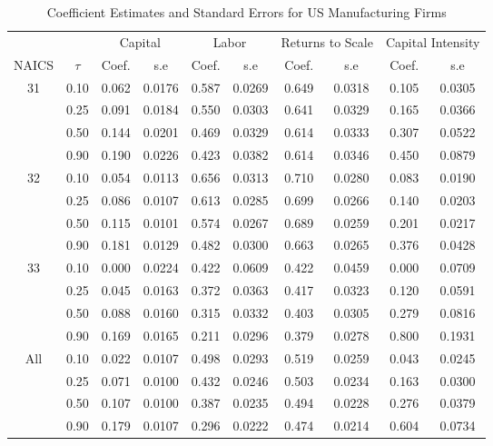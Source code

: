 \documentclass[11pt]{article}
\begin{document}
\begin{table}[H]
\centering
\caption{Coefficient Estimates and Standard Errors for US Manufacturing Firms}
\begin{tabular}{cccccccccc}
  \hline\hline & & \multicolumn{2}{c}{Capital}  & \multicolumn{2}{c}{Labor} & \multicolumn{2}{c}{Returns to Scale} & \multicolumn{2}{c}{Capital Intensity}\\ \cmidrule(lr){3-4} \cmidrule(lr){5-6} \cmidrule(lr){7-8} \cmidrule(lr){9-10}NAICS & $\tau$ & Coef. & s.e & Coef. & s.e & Coef. & s.e & Coef. & s.e \\ 
  \hline
31 & 0.10 & 0.062 & 0.0176 & 0.587 & 0.0269 & 0.649 & 0.0318 & 0.105 & 0.0305 \\ 
   & 0.25 & 0.091 & 0.0184 & 0.550 & 0.0303 & 0.641 & 0.0329 & 0.165 & 0.0366 \\ 
   & 0.50 & 0.144 & 0.0201 & 0.469 & 0.0329 & 0.614 & 0.0333 & 0.307 & 0.0522 \\ 
   & 0.90 & 0.190 & 0.0226 & 0.423 & 0.0382 & 0.614 & 0.0346 & 0.450 & 0.0879 \\ 
  32 & 0.10 & 0.054 & 0.0113 & 0.656 & 0.0313 & 0.710 & 0.0280 & 0.083 & 0.0190 \\ 
   & 0.25 & 0.086 & 0.0107 & 0.613 & 0.0285 & 0.699 & 0.0266 & 0.140 & 0.0203 \\ 
   & 0.50 & 0.115 & 0.0101 & 0.574 & 0.0267 & 0.689 & 0.0259 & 0.201 & 0.0217 \\ 
   & 0.90 & 0.181 & 0.0129 & 0.482 & 0.0300 & 0.663 & 0.0265 & 0.376 & 0.0428 \\ 
  33 & 0.10 & 0.000 & 0.0224 & 0.422 & 0.0609 & 0.422 & 0.0459 & 0.000 & 0.0709 \\ 
   & 0.25 & 0.045 & 0.0163 & 0.372 & 0.0363 & 0.417 & 0.0323 & 0.120 & 0.0591 \\ 
   & 0.50 & 0.088 & 0.0160 & 0.315 & 0.0332 & 0.403 & 0.0305 & 0.279 & 0.0816 \\ 
   & 0.90 & 0.169 & 0.0165 & 0.211 & 0.0296 & 0.379 & 0.0278 & 0.800 & 0.1931 \\ 
  All & 0.10 & 0.022 & 0.0107 & 0.498 & 0.0293 & 0.519 & 0.0259 & 0.043 & 0.0245 \\ 
   & 0.25 & 0.071 & 0.0100 & 0.432 & 0.0246 & 0.503 & 0.0234 & 0.163 & 0.0300 \\ 
   & 0.50 & 0.107 & 0.0100 & 0.387 & 0.0235 & 0.494 & 0.0228 & 0.276 & 0.0379 \\ 
   & 0.90 & 0.179 & 0.0107 & 0.296 & 0.0222 & 0.474 & 0.0214 & 0.604 & 0.0734 \\ 
   \hline
\end{tabular}
\label{USestLP}
\end{table}
\end{document}
